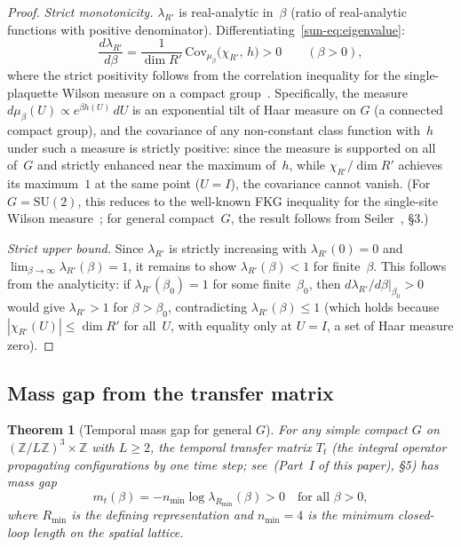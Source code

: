 \documentclass[11pt]{article}
\newtheorem{theorem}{Theorem}[section]
\theoremstyle{definition}
\newcommand{\SU}{\mathrm{SU}}
\newcommand{\Z}{\mathbb{Z}}
\begin{document}
\begin{proof}
\emph{Strict monotonicity.}
$\lambda_{R'}$ is real-analytic in~$\beta$
(ratio of real-analytic functions with positive
denominator).
Differentiating~\eqref{sun-eq:eigenvalue}:
\begin{equation}\label{sun-eq:FKG}
\frac{d\lambda_{R'}}{d\beta}
=\frac{1}{\dim R'}\,
\mathrm{Cov}_{\mu_\beta}\!\bigl(\chi_{R'},\,h\bigr)
>0\qquad(\beta>0),
\end{equation}
where the strict positivity follows from the
correlation inequality for the single-plaquette
Wilson measure on a compact
group~\cite{OsterwalderSeiler78,Seiler82}.
Specifically, the measure $d\mu_\beta(U)\propto
e^{\beta h(U)}\,dU$ is an exponential tilt of Haar
measure on $G$ (a connected compact group), and the
covariance of any non-constant class function with~$h$
under such a measure is strictly positive: since the
measure is supported on all of~$G$ and strictly
enhanced near the maximum of~$h$, while
$\chi_{R'}/\dim R'$ achieves its maximum~$1$ at the same
point ($U=I$), the covariance cannot vanish.
(For $G=\SU(2)$, this reduces to the well-known FKG
inequality for the single-site Wilson
measure~\cite{FrohlichSimon}; for general compact~$G$,
the result follows from Seiler~\cite{Seiler82},
\S3.)

\emph{Strict upper bound.}
Since $\lambda_{R'}$ is strictly increasing with
$\lambda_{R'}(0)=0$ and
$\lim_{\beta\to\infty}\lambda_{R'}(\beta)=1$,
it remains to show $\lambda_{R'}(\beta)<1$ for
finite~$\beta$.  This follows from the analyticity:
if $\lambda_{R'}(\beta_0)=1$ for some finite~$\beta_0$,
then $d\lambda_{R'}/d\beta|_{\beta_0}>0$ would give
$\lambda_{R'}>1$ for $\beta>\beta_0$, contradicting
$\lambda_{R'}(\beta)\le 1$ (which holds because
$|\chi_{R'}(U)|\le\dim R'$ for all~$U$, with equality
only at $U=I$, a set of Haar measure zero).
\end{proof}

\subsection{Mass gap from the transfer matrix}

\begin{theorem}[Temporal mass gap for general $G$]
\label{sun-thm:temporal}
For any simple compact $G$ on
$(\Z/L\Z)^3\times\Z$ with $L\ge 2$, the temporal
transfer matrix $T_t$ (the integral operator propagating
configurations by one time step; see~(Part~I of this paper),
\S5) has mass gap
\begin{equation}
m_t(\beta)=-n_{\min}\log\lambda_{R_{\min}}(\beta)>0
\quad\text{for all }\beta>0,
\end{equation}
where $R_{\min}$ is the defining representation and
$n_{\min}=4$ is the minimum closed-loop length on
the spatial lattice.
\end{theorem}
\end{document}
